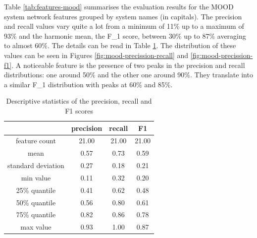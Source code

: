     Table \ref{tab:features-mood} summarises the evaluation results for the MOOD system network features grouped by system names (in capitals). The precision and recall values vary quite a lot from a minimum of 11\% up to a maximum of 93\% and the harmonic mean, the F_1 score, between 30\% up to 87\%  averaging to almost 60\%. The details can be read in Table \ref{tab:mood-accuracy}. The distribution of these values can be seen in Figures \ref{fig:mood-precission-recall} and \ref{fig:mood-precission-f1}. A noticeable feature is the presence of two peaks in the precision and recall distributions: one around 50\% and the other one around 90\%. They translate into a similar F_1 distribution with peaks at 60\% and 85\%.

    \begin{table}[!ht]
        \centering
        \begin{tabular}{|c|c|c|c|}
            \hline
            \textbf{} & \textbf{precision} & \textbf{recall} & \textbf{F1} \\ \hline
            feature count & 21.00 & 21.00 & 21.00 \\ \hline
            mean & 0.57 & 0.73 & 0.59 \\ \hline
            standard deviation & 0.27 & 0.18 & 0.21 \\ \hline
            min value & 0.11 & 0.32 & 0.20 \\ \hline
            25\% quantile & 0.41 & 0.62 & 0.48 \\ \hline
            50\% quantile & 0.56 & 0.80 & 0.61 \\ \hline
            75\% quantile & 0.82 & 0.86 & 0.78 \\ \hline
            max value & 0.93 & 1.00 & 0.87 \\ \hline
        \end{tabular}
        \caption{Descriptive statistics of the precision, recall and F1 scores}
        \label{tab:mood-accuracy}
    \end{table}

